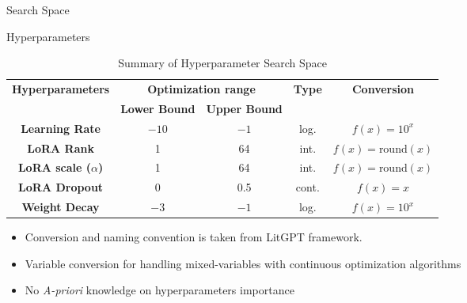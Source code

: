 \begin{frame}{Search Space}


    \begin{block}{Hyperparameters}
    
        \begin{table}[h!]
            \centering
            \begin{tabular}{|c|c|c|c|c|}
                \hline
                \multirow{2}{*}{\textbf{ Hyperparameters }} & \multicolumn{2}{|c|}{\textbf{Optimization range}} &\multirow{2}{*}{\textbf{ Type }}& \multirow{2}{*}{\textbf{ Conversion }} \\
                \cline{2-3}
                 & \textbf{ Lower Bound } & \textbf{ Upper Bound } & & \\
                \hline
                \textbf{Learning Rate} & $-10$ & $-1$ & log. & $f(x) = 10^{x}$ \\
                \hline
                \textbf{LoRA Rank} & 1 & 64 &int. &$f(x) = \text{round}(x)$ \\
                \hline
                \textbf{LoRA scale ($\alpha$)} &1 & 64 & int. &$f(x) = \text{round}(x)$ \\
                \hline
                \textbf{LoRA Dropout} & 0 & 0.5 & cont.& $f(x) = x$ \\
                \hline
                \textbf{Weight Decay} & $-3$ & $-1$ &log.& $f(x) = 10^{x}$  \\
                \hline
            \end{tabular}
            \caption{Summary of Hyperparameter Search Space}
            \label{tab:hyperparam_table}
        \end{table}
        
    \end{block}
    
    
    \begin{itemize}
        \item Conversion and naming convention is taken from LitGPT framework.
        \item Variable conversion for handling mixed-variables with continuous optimization algorithms
        \item No \textit{A-priori} knowledge on hyperparameters importance
    \end{itemize}
\end{frame}


